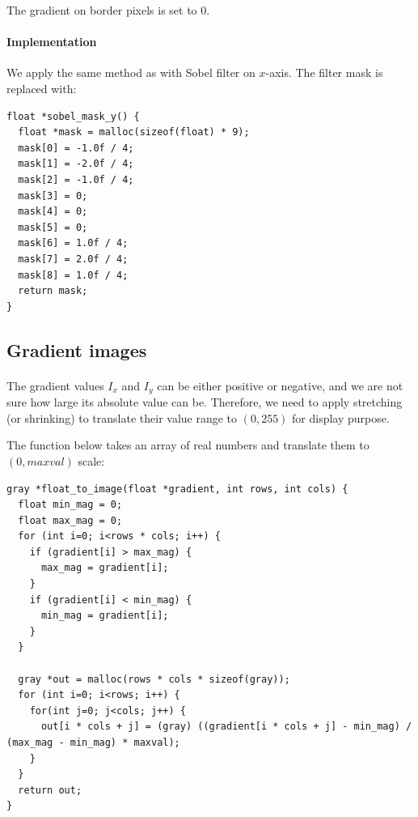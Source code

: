 \documentclass[a4paper, 10pt]{article}
\begin{document}
The gradient on border pixels is set to $0$.

\paragraph{Implementation}
We apply the same method as with Sobel filter on $x$-axis. The filter mask is replaced with:
\begin{lstlisting}[frame=single]
float *sobel_mask_y() {
  float *mask = malloc(sizeof(float) * 9);
  mask[0] = -1.0f / 4;
  mask[1] = -2.0f / 4;
  mask[2] = -1.0f / 4;
  mask[3] = 0;
  mask[4] = 0;
  mask[5] = 0;
  mask[6] = 1.0f / 4;
  mask[7] = 2.0f / 4;
  mask[8] = 1.0f / 4;
  return mask;
}
\end{lstlisting}

\subsection{Gradient images}
\paragraph{} The gradient values $I_x$ and $I_y$ can be either positive or negative, and we are not sure how large its absolute value can be. Therefore, we need to apply stretching (or shrinking) to translate their value range to $(0, 255)$ for display purpose.

The function below takes an array of real numbers and translate them to $(0, maxval)$ scale:
\begin{lstlisting}[frame=single]
gray *float_to_image(float *gradient, int rows, int cols) {
  float min_mag = 0;
  float max_mag = 0;
  for (int i=0; i<rows * cols; i++) {
    if (gradient[i] > max_mag) {
      max_mag = gradient[i];
    }
    if (gradient[i] < min_mag) {
      min_mag = gradient[i];
    }
  }

  gray *out = malloc(rows * cols * sizeof(gray));
  for (int i=0; i<rows; i++) {
    for(int j=0; j<cols; j++) {
      out[i * cols + j] = (gray) ((gradient[i * cols + j] - min_mag) / (max_mag - min_mag) * maxval);
    }
  }
  return out;
}
\end{lstlisting}
\end{document}
